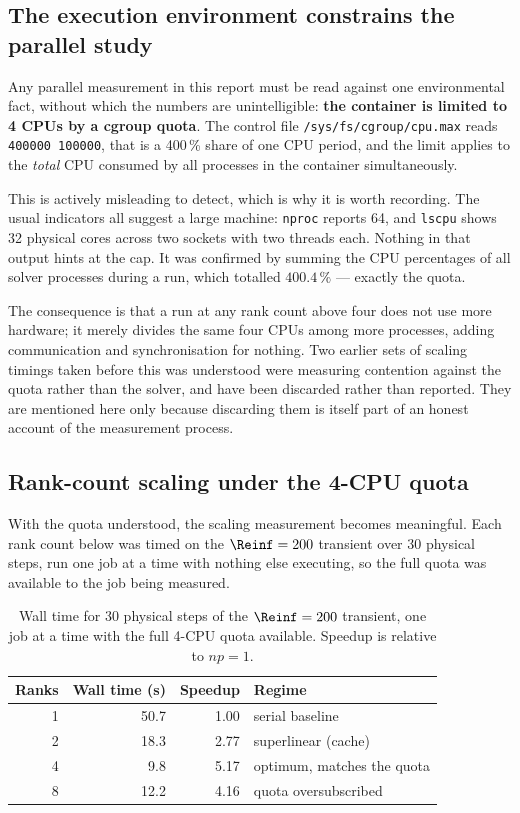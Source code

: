 \subsection{The execution environment constrains the parallel study}
\label{sec:quota}

Any parallel measurement in this report must be read against one environmental
fact, without which the numbers are unintelligible: \textbf{the container is
limited to 4 CPUs by a cgroup quota}. The control file
\texttt{/sys/fs/cgroup/cpu.max} reads \texttt{400000 100000}, that is a 400\,\%
share of one CPU period, and the limit applies to the \emph{total} CPU consumed by
all processes in the container simultaneously.

This is actively misleading to detect, which is why it is worth recording. The
usual indicators all suggest a large machine: \texttt{nproc} reports 64, and
\texttt{lscpu} shows 32 physical cores across two sockets with two threads each.
Nothing in that output hints at the cap. It was confirmed by summing the CPU
percentages of all solver processes during a run, which totalled $400.4\,\%$ ---
exactly the quota.

The consequence is that a run at any rank count above four does not use more
hardware; it merely divides the same four CPUs among more processes, adding
communication and synchronisation for nothing. Two earlier sets of scaling timings
taken before this was understood were measuring contention against the quota
rather than the solver, and have been discarded rather than reported. They are
mentioned here only because discarding them is itself part of an honest account of
the measurement process.

\subsection{Rank-count scaling under the 4-CPU quota}
\label{sec:rankchoice}

With the quota understood, the scaling measurement becomes meaningful. Each rank
count below was timed on the $\Reinf=200$ transient over 30 physical steps, run
one job at a time with nothing else executing, so the full quota was available to
the job being measured.

\begin{table}[htbp]
  \centering
  \caption{Wall time for 30 physical steps of the $\Reinf=200$ transient, one job
  at a time with the full 4-CPU quota available. Speedup is relative to $np=1$.}
  \label{tab:rankchoice}
  \small
  \begin{tabular}{rrrl}
    \toprule
    Ranks & Wall time (s) & Speedup & Regime \\
    \midrule
    1 & 50.7 & 1.00 & serial baseline \\
    2 & 18.3 & 2.77 & superlinear (cache) \\
    4 & 9.8 & 5.17 & optimum, matches the quota \\
    8 & 12.2 & 4.16 & quota oversubscribed \\
    \bottomrule
  \end{tabular}
\end{table}

